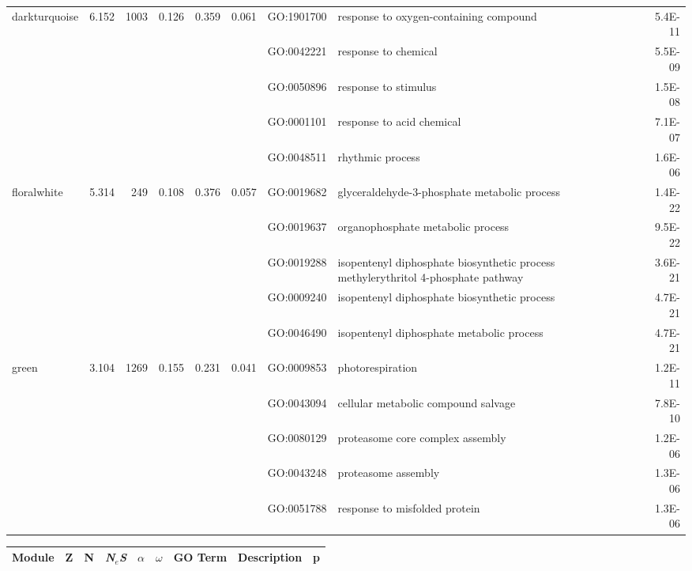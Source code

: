 \documentclass{ut-thesis}
\begin{document}
\begin{landscape}
\begin{table}[ht]
\begin{tabular}{|l|rrrrrlP{5cm}r|}
  darkturquoise & 6.152 & 1003 & 0.126 & 0.359 & 0.061 & GO:1901700 & response to oxygen-containing compound & 5.4E-11 \\ 
   &  &  &  &  &  & GO:0042221 & response to chemical & 5.5E-09 \\ 
   &  &  &  &  &  & GO:0050896 & response to stimulus & 1.5E-08 \\ 
   &  &  &  &  &  & GO:0001101 & response to acid chemical & 7.1E-07 \\ 
   &  &  &  &  &  & GO:0048511 & rhythmic process & 1.6E-06 \\ 
\hline  
floralwhite & 5.314 & 249 & 0.108 & 0.376 & 0.057 & GO:0019682 & glyceraldehyde-3-phosphate metabolic process & 1.4E-22 \\ 
   &  &  &  &  &  & GO:0019637 & organophosphate metabolic process & 9.5E-22 \\ 
   &  &  &  &  &  & GO:0019288 & isopentenyl diphosphate biosynthetic process  methylerythritol 4-phosphate pathway
 & 3.6E-21 \\ 
   &  &  &  &  &  & GO:0009240 & isopentenyl diphosphate biosynthetic process & 4.7E-21 \\ 
   &  &  &  &  &  & GO:0046490 & isopentenyl diphosphate metabolic process & 4.7E-21 \\ 
\hline 
 green & 3.104 & 1269 & 0.155 & 0.231 & 0.041 & GO:0009853 & photorespiration & 1.2E-11 \\ 
   &  &  &  &  &  & GO:0043094 & cellular metabolic compound salvage & 7.8E-10 \\ 
   &  &  &  &  &  & GO:0080129 & proteasome core complex assembly & 1.2E-06 \\ 
   &  &  &  &  &  & GO:0043248 & proteasome assembly & 1.3E-06 \\ 
   &  &  &  &  &  & GO:0051788 & response to misfolded protein & 1.3E-06 \\ 
\hline 

\end{tabular}
\end{table}


\begin{table}[ht]
\centering
\begin{tabular}{|l|rrrrrlP{5cm}r|}
  \hline
Module & Z & N & \textit{N$_{e}$S}& $\alpha$ & $\omega$ & GO Term & Description & p \\ 
  \hline


\end{tabular}
\end{table}
\end{landscape}
\end{document}

